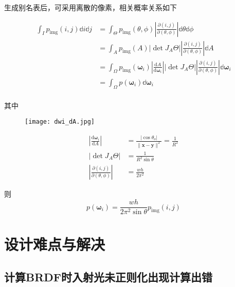\documentclass[14pt]{scrartcl} %
\begin{document}
生成别名表后，可采用离散的像素，相关概率关系如下

\begin{equation}
\begin{aligned}
\int_{I}p_{\text{img}}(i,j)\mathbb{d}i\mathbb{d}j
&=\int_{\Theta}p_{\text{img}}(\theta,\phi)\left|\frac{\partial(i,j)}{\partial(\theta,\phi)}\right|\mathbb{d}\theta\mathbb{d}\phi\\
&=\int_{A}p_{\text{img}}(A)\left|\det J_A\Theta\right|\left|\frac{\partial(i,j)}{\partial(\theta,\phi)}\right|\mathbb{d}A\\
&=\int_{\Omega}p_{\text{img}}(\pmb{\omega}_i)\left|\frac{\mathrm{d}A}{\mathrm{d}\pmb{\omega}_i}\right|\left|\det J_A{\Theta}\right|\left|\frac{\partial(i,j)}{\partial(\theta,\phi)}\right|\mathbb{d}\pmb{\omega}_i\\
&=\int_{\Omega}p(\pmb{\omega}_i)\mathbb{d}\pmb{\omega}_i\\
\end{aligned}
\end{equation}

其中
\begin{figure}[h] %
	\centering
	\texttt{[image: dwi\_dA.jpg]} %
\end{figure}

\begin{equation}
\begin{aligned}
\left|\frac{\mathrm{d}\pmb{\omega}_i}{\mathrm{d}A}\right|&=\frac{|\cos\theta_o|}{\|\pmb{x}-\pmb{y}\|^2}=\frac{1}{R^2}\\
\left|\det J_A\Theta\right|&=\frac{1}{R^2\sin\theta}\\
\left|\frac{\partial(i,j)}{\partial(\theta,\phi)}\right|&=\frac{wh}{2\pi^2}
\end{aligned}
\end{equation}

则
\begin{equation}
p(\pmb{\omega}_i)=\frac{wh}{2\pi^2\sin\theta}p_{\text{img}}(i,j)
\end{equation}


\pagebreak
\section{设计难点与解决}

\subsection{计算BRDF时入射光未正则化出现计算出错}
\end{document}
